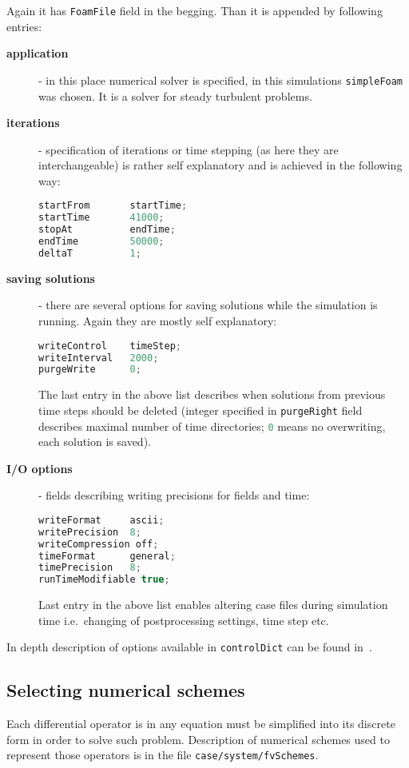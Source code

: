             Again it has \lstinline[language=C++]{FoamFile} field in the begging. Than it is appended by following entries:
            \begin{description}
                \item[\textbf{application}] - in this place numerical solver is specified, in this simulations \lstinline[language=C++]{simpleFoam} was chosen. It is a solver for steady turbulent problems.
                \item[\textbf{iterations}] - specification of iterations or time stepping (as here they are interchangeable) is rather self explanatory and is achieved in the following way:
                    \begin{lstlisting}[language=C++]
startFrom       startTime;
startTime       41000;
stopAt          endTime;
endTime         50000;
deltaT          1;
                    \end{lstlisting}
                \item[\textbf{saving solutions}] - there are several options for saving solutions while the simulation is running. Again they are mostly self explanatory:
                \begin{lstlisting}[language=C++]
writeControl    timeStep;
writeInterval   2000;
purgeWrite      0;
                \end{lstlisting}
                The last entry in the above list describes when solutions from previous time steps should be deleted (integer specified in \lstinline[language=C++]{purgeRight} field describes maximal number of time directories; \lstinline[language=C++]{0} means no overwriting, each solution is saved).
                \item[\textbf{I/O options}] - fields describing writing precisions for fields and time:
                \begin{lstlisting}[language=C++]
writeFormat     ascii;
writePrecision  8;
writeCompression off;                    
timeFormat      general;                 
timePrecision   8;
runTimeModifiable true;
                \end{lstlisting}
                Last entry in the above list enables altering case files during simulation time i.e.\ changing of postprocessing settings, time step etc.
            \end{description}
            In depth description of options available in \texttt{controlDict} can be found in~\cite{controlDict}.
        \subsection{Selecting numerical schemes}
            Each differential operator is in any equation must be simplified into its discrete form in order to solve such problem. Description of numerical schemes used to represent those operators is in the file \texttt{case/system/fvSchemes}.

